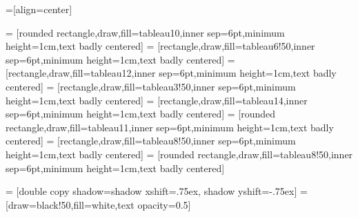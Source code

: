 



=[align=center]

 = [rounded rectangle,draw,fill=tableau10,inner sep=6pt,minimum height=1cm,text badly centered]
 = [rectangle,draw,fill=tableau6!50,inner sep=6pt,minimum height=1cm,text badly centered]
 = [rectangle,draw,fill=tableau12,inner sep=6pt,minimum height=1cm,text badly centered]
 = [rectangle,draw,fill=tableau3!50,inner sep=6pt,minimum height=1cm,text badly centered]
 = [rectangle,draw,fill=tableau14,inner sep=6pt,minimum height=1cm,text badly centered]
 = [rounded rectangle,draw,fill=tableau11,inner sep=6pt,minimum height=1cm,text badly centered]
 = [rectangle,draw,fill=tableau8!50,inner sep=6pt,minimum height=1cm,text badly centered]
 = [rounded rectangle,draw,fill=tableau8!50,inner sep=6pt,minimum height=1cm,text badly centered]


 = [double copy shadow={shadow xshift=.75ex, shadow yshift=-.75ex}]
 = [draw=black!50,fill=white,text opacity=0.5]

